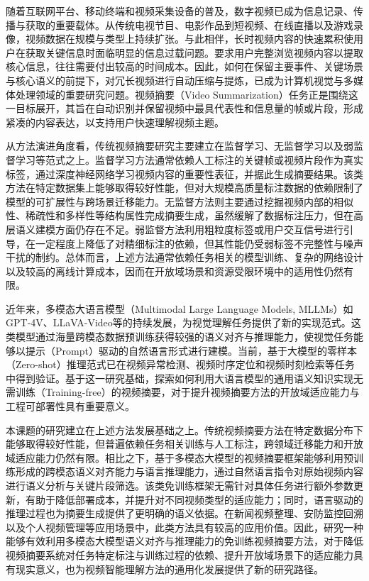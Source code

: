 


随着互联网平台、移动终端和视频采集设备的普及，数字视频已成为信息记录、传播与获取的重要载体。从传统电视节目、电影作品到短视频、在线直播以及游戏录像，视频数据在规模与类型上持续扩张。与此相伴，长时视频内容的快速累积使用户在获取关键信息时面临明显的信息过载问题。要求用户完整浏览视频内容以提取核心信息，往往需要付出较高的时间成本。因此，如何在保留主要事件、关键场景与核心语义的前提下，对冗长视频进行自动压缩与提炼，已成为计算机视觉与多媒体处理领域的重要研究问题。视频摘要（Video Summarization）任务正是围绕这一目标展开，其旨在自动识别并保留视频中最具代表性和信息量的帧或片段，形成紧凑的内容表达，以支持用户快速理解视频主题。

从方法演进角度看，传统视频摘要研究主要建立在监督学习、无监督学习以及弱监督学习等范式之上。监督学习方法\cite{huang2023causalainer, zhao2017hierarchical, chen2022video}通常依赖人工标注的关键帧或视频片段作为真实标签，通过深度神经网络学习视频内容的重要性表征，并据此生成摘要结果。该类方法在特定数据集上能够取得较好性能，但对大规模高质量标注数据的依赖限制了模型的可扩展性与跨场景迁移能力。无监督方法\cite{liang2022video,mahasseni2017unsupervised, apostolidis2022summarizing}则主要通过挖掘视频内部的相似性、稀疏性和多样性等结构属性完成摘要生成，虽然缓解了数据标注压力，但在高层语义建模方面仍存在不足。弱监督方法\cite{ye2021temporal,narasimhan2022tl}利用粗粒度标签或用户交互信号进行引导，在一定程度上降低了对精细标注的依赖，但其性能仍受弱标签不完整性与噪声干扰的制约。总体而言，上述方法通常依赖任务相关的模型训练、复杂的网络设计以及较高的离线计算成本，因而在开放域场景和资源受限环境中的适用性仍然有限。

近年来，多模态大语言模型（Multimodal Large Language Models, MLLMs）如 GPT-4V\cite{achiam2023gpt}、LLaVA-Video\cite{zhang2024video}等的持续发展，为视觉理解任务提供了新的实现范式。这类模型通过海量跨模态数据预训练获得较强的语义对齐与推理能力，使视觉任务能够以提示（Prompt）驱动的自然语言形式进行建模。当前，基于大模型的零样本（Zero-shot）推理范式已在视频异常检测\cite{zanella2024harnessing}、视频时序定位\cite{zheng2024training}和视频时刻检索\cite{luo2024zero}等任务中得到验证。基于这一研究基础，探索如何利用大语言模型的通用语义知识实现无需训练（Training-free）的视频摘要，对于提升视频摘要方法的开放域适应能力与工程可部署性具有重要意义。

本课题的研究建立在上述方法发展基础之上。传统视频摘要方法在特定数据分布下能够取得较好性能，但普遍依赖任务相关训练与人工标注，跨领域迁移能力和开放域适应能力仍然有限。相比之下，基于多模态大模型的视频摘要框架能够利用预训练形成的跨模态语义对齐能力与语言推理能力，通过自然语言指令对原始视频内容进行语义分析与关键片段筛选。该类免训练框架无需针对具体任务进行额外参数更新，有助于降低部署成本，并提升对不同视频类型的适应能力；同时，语言驱动的推理过程也为摘要生成提供了更明确的语义依据。在新闻视频整理、安防监控回溯以及个人视频管理等应用场景中，此类方法具有较高的应用价值。因此，研究一种能够有效利用多模态大模型语义对齐与推理能力的免训练视频摘要方法，对于降低视频摘要系统对任务特定标注与训练过程的依赖、提升开放域场景下的适应能力具有现实意义，也为视频智能理解方法的通用化发展提供了新的研究路径。

